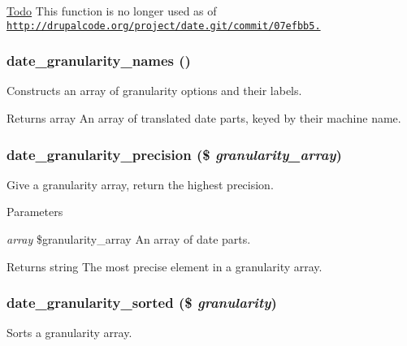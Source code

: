\begin{Desc}
\item[\hyperlink{todo__todo000047}{Todo}]This function is no longer used as of \href{http://drupalcode.org/project/date.git/commit/07efbb5.}{\tt http://drupalcode.org/project/date.git/commit/07efbb5.} \end{Desc}
\hypertarget{date__api_8module_ae1883963cdb47632622f313139f35839}{
\subsubsection[{date\_\-granularity\_\-names}]{\setlength{\rightskip}{0pt plus 5cm}date\_\-granularity\_\-names ()}}
\label{date__api_8module_ae1883963cdb47632622f313139f35839}
Constructs an array of granularity options and their labels.

\begin{DoxyReturn}{Returns}
array An array of translated date parts, keyed by their machine name. 
\end{DoxyReturn}
\hypertarget{date__api_8module_af1576bf465ba626636ebe74667618c55}{
\subsubsection[{date\_\-granularity\_\-precision}]{\setlength{\rightskip}{0pt plus 5cm}date\_\-granularity\_\-precision (\$ {\em granularity\_\-array})}}
\label{date__api_8module_af1576bf465ba626636ebe74667618c55}
Give a granularity array, return the highest precision.


\begin{DoxyParams}{Parameters}
\item[{\em array}]\$granularity\_\-array An array of date parts.\end{DoxyParams}
\begin{DoxyReturn}{Returns}
string The most precise element in a granularity array. 
\end{DoxyReturn}
\hypertarget{date__api_8module_ad1999b95cf5c3ceb6672adbe08260a24}{
\subsubsection[{date\_\-granularity\_\-sorted}]{\setlength{\rightskip}{0pt plus 5cm}date\_\-granularity\_\-sorted (\$ {\em granularity})}}
\label{date__api_8module_ad1999b95cf5c3ceb6672adbe08260a24}
Sorts a granularity array.


